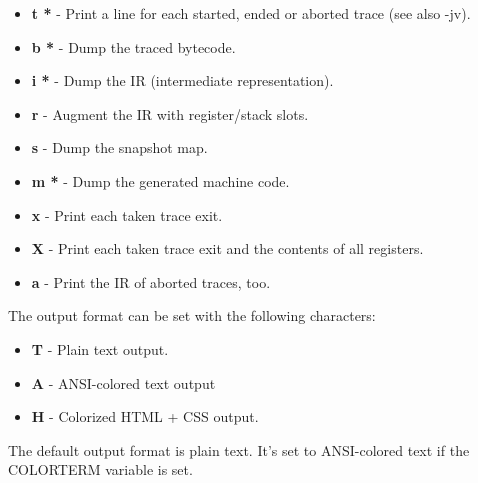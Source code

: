 \begin{itemize}
  \item \textbf{t *} - Print a line for each started, ended or aborted trace (see also -jv).
  \item \textbf{b *} - Dump the traced bytecode.
  \item \textbf{i *} - Dump the IR (intermediate representation).
  \item \textbf{r} - Augment the IR with register/stack slots.
  \item \textbf{s} - Dump the snapshot map.
  \item \textbf{m *} - Dump the generated machine code.
  \item \textbf{x} - Print each taken trace exit.
  \item \textbf{X} - Print each taken trace exit and the contents of all registers.
  \item \textbf{a} - Print the IR of aborted traces, too.
\end{itemize}
The output format can be set with the following characters:
\begin{itemize}
   \item \textbf{T} - Plain text output.
   \item \textbf{A} - ANSI-colored text output
   \item \textbf{H} - Colorized HTML + CSS output.
\end{itemize}
The default output format is plain text. It's set to ANSI-colored text
if the COLORTERM variable is set.